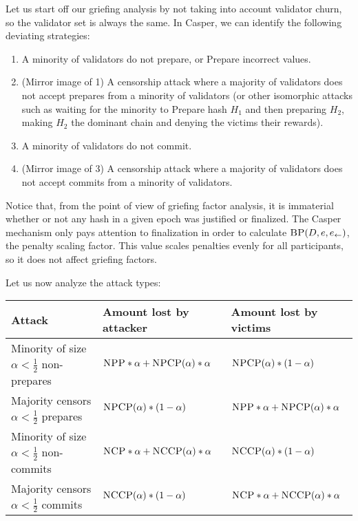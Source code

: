 \documentclass[12pt, final]{article}
\newcommand{\epoch}{\ensuremath{e}}
\newcommand{\BP}{\textsc{BP}\xspace}
\newcommand{\NCP}{\textsc{NCP}\xspace}
\newcommand{\NCCP}{\textsc{NCCP}\xspace}
\newcommand{\NPP}{\textsc{NPP}\xspace}
\newcommand{\NPCP}{\textsc{NPCP}\xspace}
\newcommand{\LFE}{ \ensuremath{\epoch_{\leftarrow}} \xspace}
\begin{document}
Let us start off our griefing analysis by not taking into account validator churn, so the validator set is always the same. In Casper, we can identify the following deviating strategies:

\begin{enumerate}
\item A minority of validators do not prepare, or Prepare incorrect values.
\item (Mirror image of 1) A censorship attack where a majority of validators does not accept prepares from a minority of validators (or other isomorphic attacks such as waiting for the minority to Prepare hash $H_1$ and then preparing $H_2$, making $H_2$ the dominant chain and denying the victims their rewards).
\item A minority of validators do not commit.
\item (Mirror image of 3) A censorship attack where a majority of validators does not accept commits from a minority of validators.
\end{enumerate}

Notice that, from the point of view of griefing factor analysis, it is immaterial whether or not any hash in a given epoch was justified or finalized. The Casper mechanism only pays attention to finalization in order to calculate $\BP(D, e, \LFE)$, the penalty scaling factor. This value scales penalties evenly for all participants, so it does not affect griefing factors.

Let us now analyze the attack types:



\begin{table}
\renewcommand{\arraystretch}{2}
\begin{tabular}{l l l }
\toprule
\textbf{Attack} & \textbf{Amount lost by attacker} & \textbf{Amount lost by victims} \\
\midrule
Minority of size $\alpha < \frac{1}{2}$ non-prepares & $\NPP * \alpha + \NPCP(\alpha) * \alpha$ & $\NPCP(\alpha) * (1-\alpha)$ \\
Majority censors $\alpha < \frac{1}{2}$ prepares & $\NPCP(\alpha) * (1-\alpha)$ & $\NPP * \alpha + \NPCP(\alpha) * \alpha$ \\
Minority of size $\alpha < \frac{1}{2}$ non-commits & $\NCP * \alpha + \NCCP(\alpha) * \alpha$ & $\NCCP(\alpha) * (1-\alpha)$ \\
Majority censors $\alpha < \frac{1}{2}$ commits & $\NCCP(\alpha) * (1-\alpha)$ & $\NCP * \alpha + \NCCP(\alpha) * \alpha$ \\
\bottomrule
\end{tabular}
\end{table}
\end{document}
